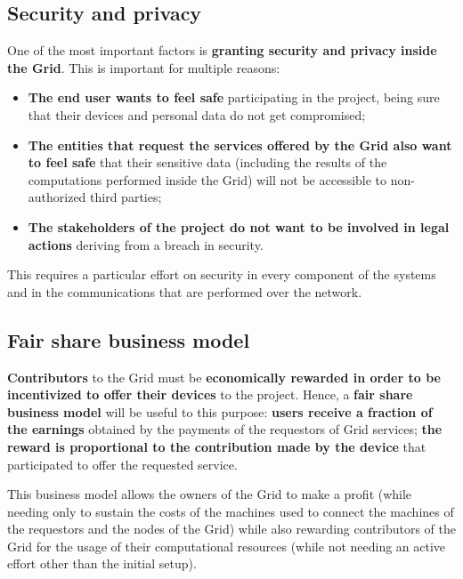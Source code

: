 \subsection{Security and privacy}
One of the most important factors is \textbf{granting security and privacy inside the Grid}. This is important for multiple reasons:
\begin{itemize}
    \item \textbf{The end user wants to feel safe }participating in the project, being sure that their devices and personal data do not get compromised;
    \item \textbf{The entities that request the services offered by the Grid also want to feel safe} that their sensitive data (including the results of the computations performed inside the Grid) will not be accessible to non-authorized third parties;
    \item \textbf{The stakeholders of the project do not want to be involved in legal actions} deriving from a breach in security.
\end{itemize}

This requires a particular effort on security in every component of the systems and in the communications that are performed over the network.

\subsection{Fair share business model}\label{fair_share_business_model}
\textbf{Contributors} to the Grid must be \textbf{economically rewarded in order to be incentivized to offer their devices} to the project. Hence, a \textbf{fair share business model} will be useful to this purpose: \textbf{users receive a fraction of the earnings} obtained by the payments of the requestors of Grid services; \textbf{the reward is proportional to the contribution made by the device} that participated to offer the requested service.

This business model allows the owners of the Grid to make a profit (while needing only to sustain the costs of the machines used to connect the machines of the requestors and the nodes of the Grid) while also rewarding contributors of the Grid for the usage of their computational resources (while not needing an active effort other than the initial setup).
